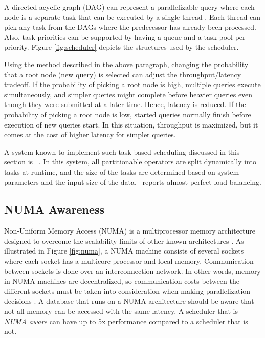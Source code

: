 A directed acyclic graph (DAG) can represent a parallelizable query where each node is a separate task that can be executed by a single thread \cite{Psaroudakis2013-fn}. Each thread can pick any task from the DAGs where the predecessor has already been processed. Also, task priorities can be supported by having a queue and a task pool per priority. Figure \ref{fig:scheduler} depicts the structures used by the scheduler.

Using the method described in the above paragraph, changing the probability that a root node (new query) is selected can adjust the throughput/latency tradeoff. If the probability of picking a root node is high, multiple queries execute simultaneously, and simpler queries might complete before heavier queries even though they were submitted at a later time. Hence, latency is reduced. If the probability of picking a root node is low, started queries normally finish before execution of new queries start. In this situation, throughput is maximized, but it comes at the cost of higher latency for simpler queries.

A system known to implement such task-based scheduling discussed in this section is \hyrise~\cite{Schwalb2014-hn}. In this system, all partitionable operators are split dynamically into tasks at runtime, and the size of the tasks are determined based on system parameters and the input size of the data. \hyrise~reports almost perfect load balancing. 

\subsection{NUMA Awareness}
\label{sub:NUMA Awareness}
Non-Uniform Memory Access (NUMA) is a multiprocessor memory architecture designed to overcome the scalability limits of other known architectures \cite{Qlik2013-an}. As illustrated in Figure \ref{fig:numa}, a NUMA machine consists of several sockets where each socket has a multicore processor and local memory. Communication between sockets is done over an interconnection network. In other words, memory in NUMA machines are decentralized, so communication costs between the different sockets must be taken into consideration when making parallelization decisions \cite{Psaroudakis2015-lc}. A database that runs on a NUMA architecture should be aware that not all memory can be accessed with the same latency. A scheduler that is \textit{NUMA aware} can have up to 5x performance compared to a scheduler that is not.

